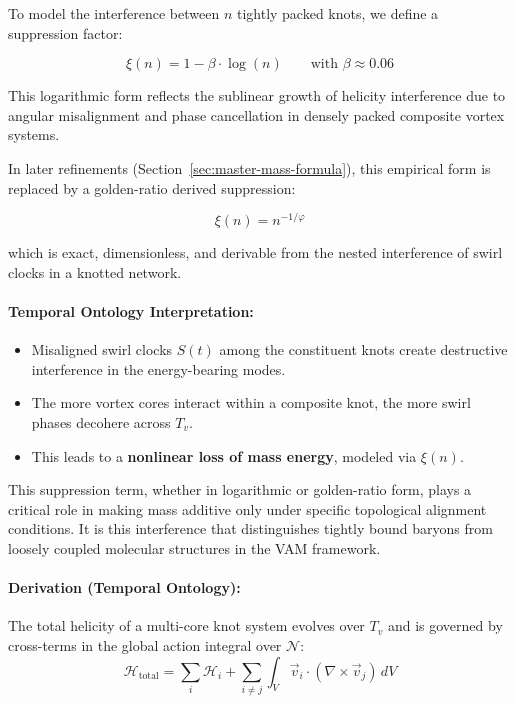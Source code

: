 To model the interference between \( n \) tightly packed knots, we define a suppression factor:

\begin{equation}
\boxed{
\xi(n) = 1 - \beta \cdot \log(n)
}
\qquad \text{with } \beta \approx 0.06
\end{equation}

This logarithmic form reflects the sublinear growth of helicity interference due to angular misalignment and phase cancellation in densely packed composite vortex systems.

In later refinements (Section~\ref{sec:master-mass-formula}), this empirical form is replaced by a golden-ratio derived suppression:

\[
\boxed{
\xi(n) = n^{-1/\varphi}
}
\]

which is exact, dimensionless, and derivable from the nested interference of swirl clocks in a knotted network.

\paragraph{Temporal Ontology Interpretation:}
\begin{itemize}
\item  Misaligned swirl clocks \( S(t) \) among the constituent knots create destructive interference in the energy-bearing modes.
\item  The more vortex cores interact within a composite knot, the more swirl phases decohere across \( T_v \).
\item  This leads to a \textbf{nonlinear loss of mass energy}, modeled via \( \xi(n) \).
\end{itemize}

This suppression term, whether in logarithmic or golden-ratio form, plays a critical role in making mass additive only under specific topological alignment conditions. It is this interference that distinguishes tightly bound baryons from loosely coupled molecular structures in the VAM framework.

\paragraph{Derivation (Temporal Ontology):}
The total helicity of a multi-core knot system evolves over $T_v$ and is governed by cross-terms in the global action integral over $\mathcal{N}$:
\begin{equation}
\mathcal{H}_{\text{total}} = \sum_i \mathcal{H}_i + \sum_{i \neq j} \int_V \vec{v}_i \cdot (\nabla \times \vec{v}_j) \, dV
\end{equation}

